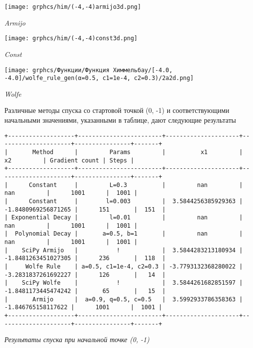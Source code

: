 \documentclass{article}
\begin{document}
\begin{center}
    \texttt{[image: grphcs/him/(-4,-4)armijo3d.png]}

    { \it Armijo}
\end{center}

\begin{center}
    \texttt{[image: grphcs/him/(-4,-4)const3d.png]}

    { \it Const}
\end{center}

\begin{center}
    \texttt{[image: grphcs/Функции/Функция Химмельбау/[-4.0, -4.0]/wolfe\_rule\_gen(α=0.5, c1=1e-4, c2=0.3)/2a2d.png]}

    { \it Wolfe}
\end{center}


Различные методы спуска со стартовой точкой (0, -1) и соответствующими начальными значениями, указанными в таблице, дают следующие результаты

\newpage

\begin{center}
{ \scriptsize
\begin{verbatim}
+-------------------+------------------------+---------------------+---------------------+----------------+-------+
|       Method      |         Params         |          x1         |          x2         | Gradient count | Steps |
+-------------------+------------------------+---------------------+---------------------+----------------+-------+
|      Constant     |         L=0.3          |         nan         |         nan         |      1001      |  1001 |
|      Constant     |        l=0.003         |  3.5844256385929363 | -1.8480969256871265 |      151       |  151  |
| Exponential Decay |         l=0.01         |         nan         |         nan         |      1001      |  1001 |
|  Polynomial Decay |       a=0.5, b=1       |         nan         |         nan         |      1001      |  1001 |
|    SciPy Armijo   |           !            |  3.5844283213180934 | -1.8481263451027305 |      236       |  118  |
|     Wolfe Rule    | a=0.5, c1=1e-4, c2=0.3 | -3.7793132368280022 | -3.2831837261692227 |      126       |   14  |
|    SciPy Wolfe    |           !            |  3.5844261682851597 | -1.8481173445474242 |       65       |   15  |
|       Armijo      |  a=0.9, q=0.5, c=0.5   |  3.5992933786358363 |  -1.846765158117622 |      1001      |  1001 |
+-------------------+------------------------+---------------------+---------------------+----------------+-------+
\end{verbatim}
}
{ \it Результаты спуска при начальной точке (0, -1)}
\end{center}
\end{document}
